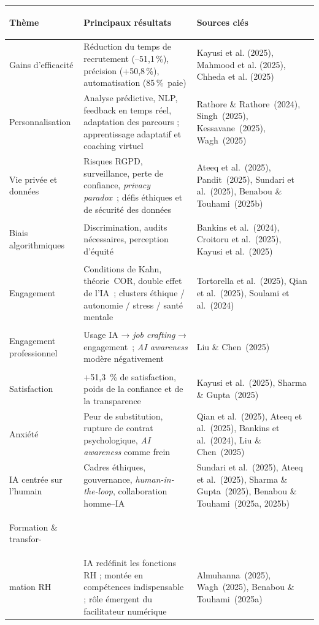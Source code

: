 \documentclass[12pt,a4paper]{article}
\begin{document}
\begin{longtable}{>{\bfseries\raggedright}p{3.4cm} >{\raggedright}p{6.2cm} >{\raggedright\arraybackslash}p{4.6cm}}
\toprule
Thème & Principaux résultats & Sources clés \\
\midrule
\endhead
\bottomrule
\endfoot

Gains d'efficacité
  & Réduction du temps de recrutement (--51,1\,\%), précision (+50,8\,\%),
    automatisation (85\,\%~paie)
  & Kayusi et al. (2025), Mahmood et al. (2025), Chheda et al. (2025) \\[6pt]

Personnalisation
  & Analyse prédictive, NLP, feedback en temps réel, adaptation des
    parcours ; apprentissage adaptatif et coaching virtuel
  & Rathore \& Rathore~(2024), Singh~(2025), Kessavane~(2025),
    Wagh~(2025) \\[6pt]

Vie privée et données
  & Risques RGPD, surveillance, perte de confiance, \emph{privacy
    paradox}~; défis éthiques et de sécurité des données
  & Ateeq et al.~(2025), Pandit~(2025), Sundari et al.~(2025),
    Benabou \& Touhami~(2025b) \\[6pt]

Biais algorithmiques
  & Discrimination, audits nécessaires, perception d'équité
  & Bankins et al.~(2024), Croitoru et al.~(2025),
    Kayusi et al.~(2025) \\[6pt]

Engagement
  & Conditions de Kahn, théorie~COR, double effet de l'IA~;
    clusters éthique / autonomie / stress / santé mentale
  & Tortorella et al.~(2025), Qian et al.~(2025),
    Soulami et al.~(2024) \\[6pt]

Engagement professionnel
  & Usage IA → \emph{job crafting} → engagement~; \emph{AI awareness}
    modère négativement
  & Liu \& Chen~(2025) \\[6pt]

Satisfaction
  & +51,3~\% de satisfaction, poids de la confiance et de la transparence
  & Kayusi et al.~(2025), Sharma \& Gupta~(2025) \\[6pt]

Anxiété
  & Peur de substitution, rupture de contrat psychologique,
    \emph{AI awareness} comme frein
  & Qian et al.~(2025), Ateeq et al.~(2025), Bankins et al.~(2024),
    Liu \& Chen~(2025) \\[6pt]

IA centrée sur l'humain
  & Cadres éthiques, gouvernance, \emph{human-in-the-loop},
    collaboration homme--IA
  & Sundari et al.~(2025), Ateeq et al.~(2025), Sharma \& Gupta~(2025),
    Benabou \& Touhami~(2025a, 2025b) \\[6pt]

Formation \& transfor-\\mation RH
  & IA redéfinit les fonctions RH ; montée en compétences
    indispensable ; rôle émergent du facilitateur numérique
  & Almuhanna~(2025), Wagh~(2025),
    Benabou \& Touhami~(2025a) \\

\end{longtable}
\end{document}
